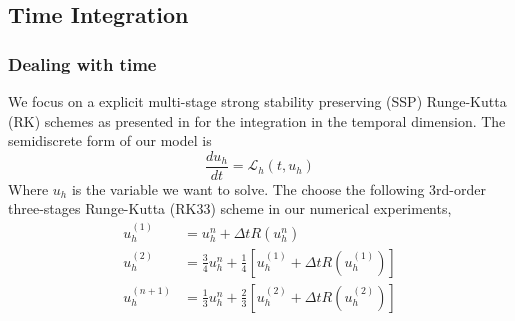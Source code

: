 \subsection{Time Integration}
\begin{frame} \frametitle{Dealing with time}
	We focus on a explicit multi-stage strong stability preserving (SSP) Runge-Kutta (RK) schemes as presented in \cite{Gottlieb2005} for the integration in the temporal dimension. The semidiscrete form of our model is 
	\begin{equation}
		\frac{du_h}{dt} = \mathcal{L}_h(t,u_h)
	\label{eq:semidiscrete_problem}
	\end{equation}
	Where $u_h$ is the variable we want to solve. The choose the following 3rd-order three-stages Runge-Kutta (RK33) scheme in our numerical experiments, 
	\begin{equation}
		\begin{split}
		u_h^{(1)}   &= u_h^{n} + \Delta t R(u_h^{n}) \\
		u_h^{(2)}   &= \frac{3}{4} u_h^{n} + \frac{1}{4}[u_h^{(1)}+\Delta t R(u_h^{(1)})] \\
		u_h^{(n+1)} &= \frac{1}{3} u_h^{n} + \frac{2}{3}[u_h^{(2)}+\Delta t R(u_h^{(2)})]
	\end{split}
	\label{eq:RK33}
	\end{equation}
\end{frame}